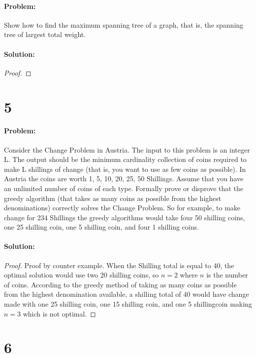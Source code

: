 \documentclass[12pt]{article}
\begin{document}
\paragraph{Problem:}
Show how to find the maximum spanning tree of a graph, that is, the spanning tree of largest
total weight.
\paragraph{Solution:}
\begin{proof}
\end{proof}

\section*{5}
\paragraph{Problem:}
Consider the Change Problem in Austria. The input to this problem is
an integer L. The output should be the minimum cardinality collection
of coins required to make L shillings of change (that is, you want to use
as few coins as possible). In Austria the coins are worth 1, 5, 10, 20, 25,
50 Shillings. Assume that you have an unlimited number of coins of each
type. Formally prove or disprove that the greedy algorithm (that takes as
many coins as possible from the highest denominations) correctly solves
the Change Problem. So for example, to make change for 234 Shillings the
greedy algorithms would take four 50 shilling coins, one 25 shilling coin,
one 5 shilling coin, and four 1 shilling coins.
\paragraph{Solution:}
\begin{proof}
Proof by counter example.
When the Shilling total is equal to 40, the optimal solution would use two 20 shilling coins, so $n=2$ where $n$ is the number of coins.  According to the greedy method of taking as many coins as possible from the highest denomination available, a shilling total of 40 would have change made with one 25 shilling coin, one 15 shilling coin, and one 5 shillingcoin making $n=3$ which is not optimal.
\end{proof}

\section*{6}
\end{document}
